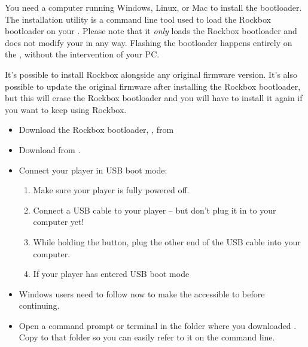 You need a computer running Windows, Linux, or Mac to install the bootloader.
The installation utility  is a command line tool used to load the
Rockbox bootloader on your \dap{}. Please note that it \emph{only} loads the
Rockbox bootloader and does not modify your \dap{} in any way. Flashing the
bootloader happens entirely on the \dap{}, without the intervention of your PC.

It's possible to install Rockbox alongside any original firmware version.
It's also possible to update the original firmware after installing the Rockbox
bootloader, but this will erase the Rockbox bootloader and you will have to
install it again if you want to keep using Rockbox.

\begin{itemize}\label{ref:jztool_load_bootloader}
\item Download the Rockbox bootloader, \bootfilename{}, from
\item Download  from .
\item Connect your player in USB boot mode:
  \begin{enumerate}
    \item Make sure your player is fully powered off.
    \item Connect a USB cable to your player -- but don't plug it in to your
      computer yet!
    \item While holding the \ActionIngenicUSBBoot{} button, plug the other end
      of the USB cable into your computer.
    \item If your player has entered USB boot mode%
  \end{enumerate}
\item Windows users need to follow  now
  to make the \playertype{} accessible to  before continuing.
\item Open a command prompt or terminal in the folder where you downloaded
  . Copy \bootfilename{} to that folder so you can easily refer
  to it on the command line.


\end{itemize}
